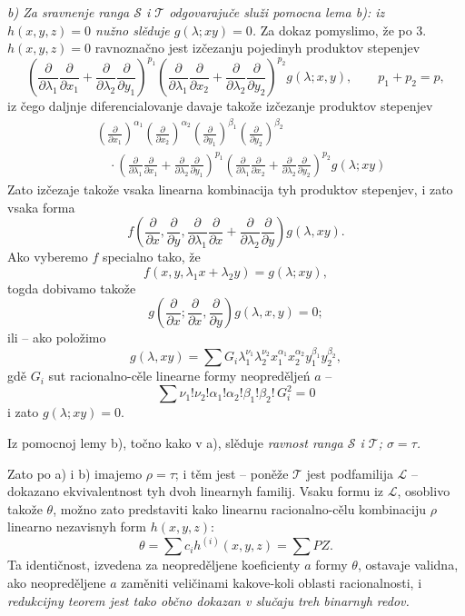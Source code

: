 \documentclass[11pt]{article}
\begin{document}
{\itshape b) Za sravnenje ranga $\mathcal S$ i $\mathcal T$ odgovarajuče služi pomocna lema b): iz $h(x,y,z)=0$ nužno slěduje $g(\lambda;xy)=0$.} Za dokaz pomyslimo, že po 3. $h(x,y,z)=0$ ravnoznačno jest izčezanju pojedinyh produktov stepenjev
\[
 \left(\frac{\partial}{\partial\lambda_1}\frac{\partial}{\partial x_1}
 +\frac{\partial}{\partial\lambda_2}\frac{\partial}{\partial y_1}\right)^{p_1}
 \left(\frac{\partial}{\partial\lambda_1}\frac{\partial}{\partial x_2}
 +\frac{\partial}{\partial\lambda_2}\frac{\partial}{\partial y_2}\right)^{p_2}g(\lambda;x,y),
 \qquad p_1+p_2=p,
\]
iz čego daljnje diferencialovanje davaje takože izčezanje produktov stepenjev
\[
\begin{aligned}
&\left(\frac{\partial}{\partial x_1}\right)^{\alpha_1}
 \left(\frac{\partial}{\partial x_2}\right)^{\alpha_2}
 \left(\frac{\partial}{\partial y_1}\right)^{\beta_1}
 \left(\frac{\partial}{\partial y_2}\right)^{\beta_2} \\
&\quad\cdot
 \left(\frac{\partial}{\partial\lambda_1}\frac{\partial}{\partial x_1}
 +\frac{\partial}{\partial\lambda_2}\frac{\partial}{\partial y_1}\right)^{p_1}
 \left(\frac{\partial}{\partial\lambda_1}\frac{\partial}{\partial x_2}
 +\frac{\partial}{\partial\lambda_2}\frac{\partial}{\partial y_2}\right)^{p_2}
 g(\lambda;xy)
\end{aligned}
\]
Zato izčezaje takože vsaka linearna kombinacija tyh produktov stepenjev, i zato vsaka forma
\[
  f\left(\frac{\partial}{\partial x},\frac{\partial}{\partial y},
  \frac{\partial}{\partial\lambda_1}\frac{\partial}{\partial x}
  +\frac{\partial}{\partial\lambda_2}\frac{\partial}{\partial y}\right)g(\lambda,xy).
\]
Ako vyberemo $f$ specialno tako, že
\[
  f(x,y,\lambda_1x+\lambda_2y)=g(\lambda;xy),
\]
togda dobivamo takože
\[
  g\left(\frac{\partial}{\partial x};
    \frac{\partial}{\partial x},
    \frac{\partial}{\partial y}\right)g(\lambda,x,y)=0;
\]
ili -- ako položimo
\[
  g(\lambda,xy)=\sum G_i\lambda_1^{\nu_1}\lambda_2^{\nu_2}
  x_1^{\alpha_1}x_2^{\alpha_2}y_1^{\beta_1}y_2^{\beta_2},
\]
gdě $G_i$ sut racionalno-cěle linearne formy neopreděljeń $a$ -- 
\[
  \sum \nu_1!\nu_2!\alpha_1!\alpha_2!\beta_1!\beta_2!\,G_i^2=0
\]
i zato $g(\lambda;xy)=0$.

Iz pomocnoj lemy b), točno kako v a), slěduje {\itshape ravnost ranga $\mathcal S$ i $\mathcal T$; $\sigma=\tau$.}

Zato po a) i b) imajemo $\rho=\tau$; i těm jest -- poněže $\mathcal T$ jest podfamilija $\mathcal L$ -- dokazano ekvivalentnost tyh dvoh linearnyh familij. Vsaku formu iz $\mathcal L$, osoblivo takože $\theta$, možno zato predstaviti kako linearnu racionalno-cělu kombinaciju $\rho$ linearno nezavisnyh form $h(x,y,z)$:
\[
  \theta=\sum c_i h^{(i)}(x,y,z)=\sum PZ.
\]
Ta identičnost, izvedena za neopreděljene koeficienty $a$ formy $\theta$, ostavaje validna, ako neopreděljene $a$ zaměniti veličinami kakove-koli oblasti racionalnosti, i {\itshape redukcijny teorem jest tako občno dokazan v slučaju treh binarnyh redov.}
\end{document}
